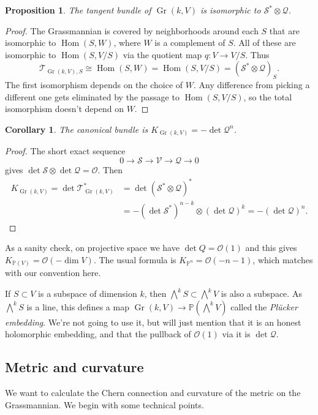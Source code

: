 \documentclass[10pt,a4paper]{article}
\newtheorem{prop}[theo]{Proposition}
\newtheorem{coro}[theo]{Corollary}
\newtheorem*{proof}{Proof}
\newcommand{\kk}[1]{\mathbb{#1}}
\newcommand{\cc}[1]{\mathcal{#1}}
\def\qedhere{}
\DeclareMathOperator{\Gr}{Gr}
\DeclareMathOperator{\Hom}{Hom}
\begin{document}
\begin{prop}
The tangent bundle of $\Gr(k,V)$ is isomorphic to $\cc S^* \otimes \cc Q$.
\end{prop}


\begin{proof}
The Grassmannian is covered by neighborhoods around each $S$ that are isomorphic to $\Hom(S, W)$, where $W$ is a complement of $S$. All of these are isomorphic to $\Hom(S, V/S)$ via the quotient map $q : V \to V/S$. Thus
\[
\cc T_{\Gr(k,V),S}
\cong \Hom(S,W)
= \Hom(S,V/S)
= (\cc S^* \otimes \cc Q)_S.
\]
The first isomorphism depends on the choice of $W$. Any difference from picking a different one gets eliminated by the passage to $\Hom(S,V/S)$, so the total isomorphism doesn't depend on $W$.
\end{proof}


\begin{coro}
The canonical bundle is $K_{\Gr(k, V)} = -\det \cc Q^{n}$.
\end{coro}

\begin{proof}
The short exact sequence
$$
0 \to \cc S \to \cc V \to \cc Q \to 0
$$
gives $\det \cc S \otimes \det \cc Q = \cc O$. Then
\begin{align*}
K_{\Gr(k,V)}
= \det \cc T_{\Gr(k,V)}^*
&= \det (\cc S^* \otimes \cc Q)^*
\\
&= - (\det \cc S^*)^{n-k} \otimes (\det \cc Q)^k
= - (\det \cc Q)^{n}.
\qedhere
\end{align*}
\end{proof}

As a sanity check, on projective space we have $\det Q = \cc O(1)$ and this gives $K_{\kk P(V)} = \cc O(-\dim V)$. The usual formula is $K_{\kk P^n} = \cc O(-n-1)$, which matches with our convention here.


If $S \subset V$ is a subspace of dimension $k$, then $\bigwedge^k S \subset \bigwedge^k V$ is also a subspace. As $\bigwedge^k S$ is a line, this defines a map $\Gr(k,V) \to \kk P(\bigwedge^k V)$ called the \emph{Pl\"ucker embedding}. We're not going to use it, but will just mention that it is an honest holomorphic embedding, and that the pullback of $\cc O(1)$ via it is $\det \cc Q$.



\subsection{Metric and curvature}


We want to calculate the Chern connection and curvature of the metric on the Grassmannian. We begin with some technical points.
\end{document}
